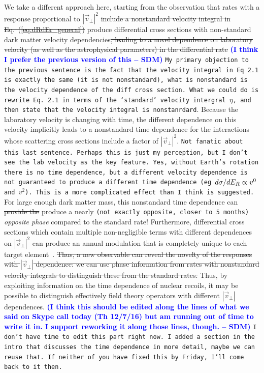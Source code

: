\documentclass[11pt]{article}
\newcommand{\Eq}[1]{Eq.~(\ref{#1})} \newcommand{\Eqs}[2]{Eqs.~(\ref{#1}) and (\ref{#2})} \newcommand{\Eqm}[2]{Eqs.~(\ref{#1}) through (\ref{#2})}
\newcommand{\sdm}[1]{\textcolor{blue}{\textbf{(#1 -- SDM)}}}
\newcommand{\sjwColor}{red}
\newcommand{\sjw}[1]{{\color{\sjwColor} #1}}
\newcommand{\sjwrm}[1]{{\color{\sjwColor}\protect\sout{#1}}}
\newcommand{\sjwtt}[1]{{\color{\sjwColor}\tt #1}}
\begin{document}
We take a different approach here, starting from the observation that rates with a response proportional to $| \vec v_\perp|^2$ \sjwrm{include a nonstandard velocity integral in \Eq{eq:dRdEr_general}}  \sjw{produce differential cross sections with non-standard dark matter velocity dependencies}\sjwrm{, leading to a novel dependence on laboratory velocity (as well as the astrophysical parameters) in the differential rate }\cite{Fitzpatrick:2010br} \sdm{I think I prefer the previous version of this} \sjwtt{My primary objection to the previous sentence is the fact that the velocity integral in Eq 2.1 is exactly the same (it is not nonstandard), what is nonstandard is the velocity dependence of the diff cross section. What we could do is rewrite Eq. 2.1 in terms of the `standard' velocity intergral $\eta$, and then state that the velocity integral is nonstanrdard}. Because the laboratory velocity is changing with time, the different dependence on this velocity implicitly leads to a nonstandard time dependence for the interactions whose scattering cross sections include a factor of $|\vec v_\perp|^2$. \sjwtt{Not fanatic about this last sentence. Perhaps this is just my perception, but I don't see the lab velocity as the key feature. Yes, without Earth's rotation there is no time dependence, but a different velocity dependence is not guaranteed to produce a different time dependence (eg $d \sigma / d E_R \propto v^0$ and $v^2$). This is a more complicated effect than I think is suggested.} For large enough dark matter mass, this nonstandard time dependence can \sjwrm{provide the} \sjw{produce a nearly} \sjwtt{(not exactly opposite, closer to 5 months)} {\it opposite phase} compared to the standard rate! \sjw{Furthermore, differential cross sections which contain multiple non-negligible terms with different dependences on $|\vec v_\perp|^2$ can produce an annual modulation that is completely unique to each target element~\cite{DelNobile:2015tza,DelNobile:2015rmp}.} \sjwrm{Thus, a new observable can reveal the novelty of the responses with $|\vec v_\perp|$ dependence: we can use phase information from rates with nonstandard velocity integrals to distinguish these from the standard rates.} \sjw{Thus, by exploiting information on the time dependence of nuclear recoils, it may be possible to distinguish effectively field theory operators with different $|\vec v_\perp|$ dependences.  } \sdm{I think this should be edited along the lines of what we said on Skype call today (Th 12/7/16) but am running out of time to write it in. I support reworking it along those lines, though.} \sjwtt{I don't have time to edit this part right now. I added a section in the intro that discusses the time dependence in more detail, maybe we can reuse that. If neither of you have fixed this by Friday, I'll come back to it then.}
\end{document}
